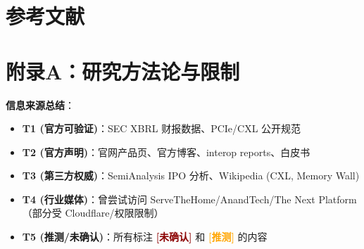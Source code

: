 \documentclass[11pt,a4paper]{ctexart}
\newcommand{\unverified}{{\textcolor{darkred}{\textbf{[未确认]}}}}
\newcommand{\speculation}{{\textcolor{orange}{\textbf{[推测]}}}}
\begin{document}








\clearpage
\section{参考文献}


\clearpage
\section*{附录A：研究方法论与限制}

\textbf{信息来源总结}：
\begin{itemize}
    \item \textbf{T1 (官方可验证)}：SEC XBRL 财报数据、PCIe/CXL 公开规范
    \item \textbf{T2 (官方声明)}：官网产品页、官方博客、interop reports、白皮书
    \item \textbf{T3 (第三方权威)}：SemiAnalysis IPO 分析、Wikipedia (CXL, Memory Wall)
    \item \textbf{T4 (行业媒体)}：曾尝试访问 ServeTheHome/AnandTech/The Next Platform（部分受 Cloudflare/权限限制）
    \item \textbf{T5 (推测/未确认)}：所有标注 \unverified{} 和 \speculation{} 的内容
\end{itemize}
\end{document}
